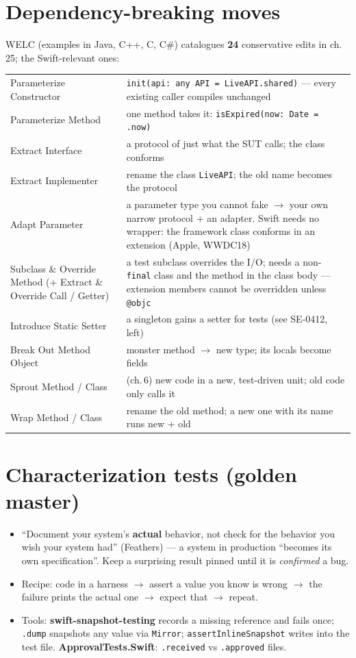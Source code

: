\documentclass[8pt]{extarticle}
\newcommand\ct[1]{\texttt{#1}}
\begin{document}
\begin{multicols}{2}
\section{Dependency-breaking moves}
WELC (examples in Java, C++, C, C\#) catalogues \textbf{24} conservative edits in ch.\,25;
the Swift-relevant ones:\par
{\scriptsize\setlength{\tabcolsep}{2pt}
\begin{tabular}{@{}L{22mm}L{56mm}@{}}
\toprule
Parameterize Constructor & \ct{init(api: any API = LiveAPI.shared)} — every existing caller compiles unchanged\\
Parameterize Method & one method takes it: \ct{isExpired(now: Date = .now)}\\
Extract Interface & a protocol of just what the SUT calls; the class conforms\\
Extract Implementer & rename the class \ct{LiveAPI}; the old name becomes the protocol\\
Adapt Parameter & a parameter type you cannot fake $\rightarrow$ your own narrow protocol + an adapter. Swift needs no wrapper: the framework class conforms in an extension (Apple, WWDC18)\\
Subclass \& Override Method (+ Extract \& Override Call / Getter) & a test subclass overrides the I/O; needs a non-\ct{final} class and the method in the class body — extension members cannot be overridden unless \ct{@objc}\\
Introduce Static Setter & a singleton gains a setter for tests (see SE-0412, left)\\
Break Out Method Object & monster method $\rightarrow$ new type; its locals become fields\\
Sprout Method / Class & (ch.\,6) new code in a new, test-driven unit; old code only calls it\\
Wrap Method / Class & rename the old method; a new one with its name runs new + old\\
\bottomrule
\end{tabular}}

\section{Characterization tests (golden master)}
\begin{itemize}
  \item ``Document your system's \textbf{actual} behavior, not check for the behavior you wish
        your system had'' (Feathers) — a system in production ``becomes its own specification''.
        Keep a surprising result pinned until it is \emph{confirmed} a bug.
  \item Recipe: code in a harness $\rightarrow$ assert a value you know is wrong $\rightarrow$ the
        failure prints the actual one $\rightarrow$ expect that $\rightarrow$ repeat.
  \item Tools: \textbf{swift-snapshot-testing} records a missing reference and fails once;
        \ct{.dump} snapshots any value via \ct{Mirror}; \ct{assertInlineSnapshot} writes into
        the test file. \textbf{ApprovalTests.Swift}: \ct{.received} vs \ct{.approved} files.
\end{itemize}


\end{multicols}
\end{document}
